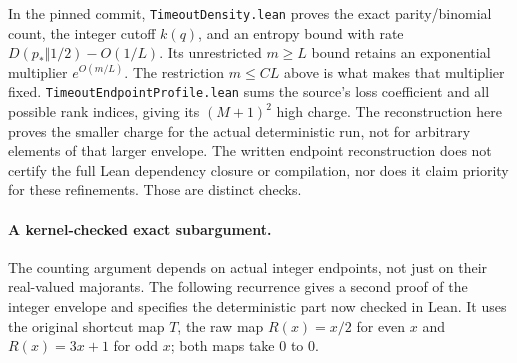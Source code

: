 In the pinned commit, \texttt{TimeoutDensity.lean} proves the exact
parity/binomial count, the integer cutoff \(k(q)\), and an entropy
bound with rate \(D(p_*\Vert1/2)-O(1/L)\). Its unrestricted \(m\ge L\)
bound retains an exponential multiplier \(e^{O(m/L)}\).
The restriction \(m\le CL\) above is what makes that multiplier fixed.
\texttt{TimeoutEndpointProfile.lean} sums the source's loss coefficient
and all possible rank indices, giving its \((M+1)^2\) high charge.
The reconstruction here proves the smaller charge for the actual
deterministic run, not for arbitrary elements of that larger envelope.
The written endpoint reconstruction does not certify the full Lean
dependency closure or compilation, nor does it claim priority for
these refinements. Those are distinct checks.


\paragraph{A kernel-checked exact subargument.}
The counting argument depends on actual integer endpoints, not just on
their real-valued majorants. The following recurrence gives a second
proof of the integer envelope and specifies the deterministic part
now checked in Lean. It uses the original shortcut map \(T\), the raw
map \(R(x)=x/2\) for even \(x\) and \(R(x)=3x+1\) for odd \(x\);
both maps take \(0\) to \(0\).

